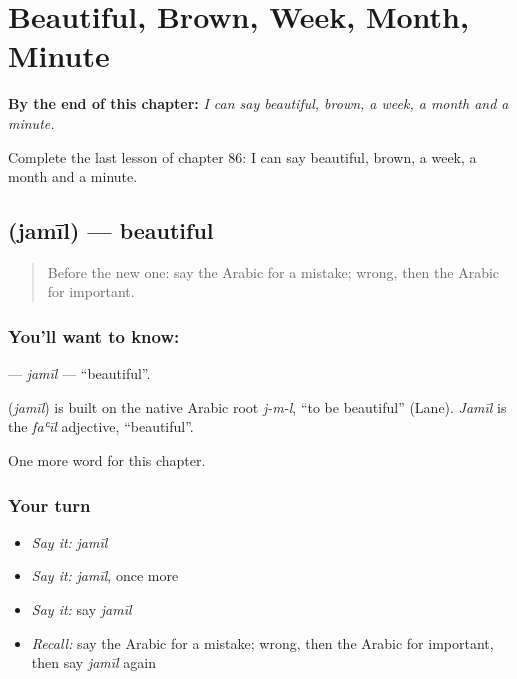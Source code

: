 
\chapter{Beautiful, Brown, Week, Month, Minute}
\label{ch:ar-beautiful-brown-week-month-minute}

\begin{chapteropening}
\textbf{By the end of this chapter:} \emph{I can say beautiful, brown, a week, a month and a minute.}

Complete the last lesson of chapter 86: I can say beautiful, brown, a week, a month and a minute.
\end{chapteropening}

\section[\texorpdfstring{\ar{جميل} (jamīl)}{جميل (jamīl)}]{ (jamīl) — beautiful}

\label{lesson:AR-C86-jamil}



\begin{quote}
Before the new one: say the Arabic for a mistake; wrong, then the Arabic for important.
\end{quote}

\subsection*{You'll want to know: }
\textbf{} — \emph{jamīl} — \textquotedblleft{}beautiful\textquotedblright{}.

\begin{cousinweb}
\textbf{} (\emph{jamīl}) is built on the native Arabic root \emph{j-m-l}, \textquotedblleft{}to be beautiful\textquotedblright{} (Lane). \emph{Jamīl} is the \emph{faʿīl} adjective, \textquotedblleft{}beautiful\textquotedblright{}.
\end{cousinweb}

\begin{grammarlens}[title={What you've built}]
One more word for this chapter.
\end{grammarlens}

\subsection*{Your turn}
\begin{itemize}
\raggedright
  \item \emph{Say it:} \emph{jamīl}
  \item \emph{Say it:} \emph{jamīl}, once more
  \item \emph{Say it:} say \emph{jamīl}
  \item \emph{Recall:} say the Arabic for a mistake; wrong, then the Arabic for important, then say \emph{jamīl} again
\end{itemize}

